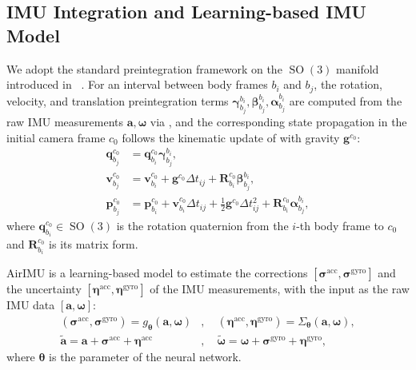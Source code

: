\subsection{IMU Integration and Learning-based IMU Model}
We adopt the standard preintegration framework on the $\operatorname{SO}(3)$ manifold introduced in ~\cite{forster2015imu}.
For an interval between body frames $b_i$ and $b_j$, the rotation, velocity, and translation preintegration terms $\bm{\gamma}_{b_j}^{b_i}, \bm{\beta}_{b_j}^{b_i}, \bm{\alpha}_{b_j}^{b_i}$ are computed from the raw IMU measurements $\mathbf{a},\bm{\omega}$ via , and the corresponding state propagation in the initial camera frame $c_0$ follows the kinematic update of  with gravity $\mathbf{g}^{c_0}$:
\begin{equation}
\label{eq:maci2:imu_integration}
\begin{aligned}
\mathbf{q}^{c_0}_{b_j} &= \mathbf{q}^{c_0}_{b_i} \bm{\gamma}_{b_j}^{b_i}, \\
\mathbf{v}_{b_j}^{c_0} &= \mathbf{v}_{b_i}^{c_0} + \mathbf{g}^{c_0} \Delta t_{ij} + \mathbf{R}^{c_0}_{b_i} \bm{\beta}_{b_j}^{b_i}, \\
\mathbf{p}^{c_0}_{b_{j}} &= \mathbf{p}^{c_0}_{b_i} + \mathbf{v}^{c_0}_{b_i} \Delta t_{ij} + \frac{1}{2} \mathbf{g}^{c_0} \Delta t_{ij}^2 + \mathbf{R}^{c_0}_{b_i} \bm{\alpha}_{b_j}^{b_i},
\end{aligned}
\end{equation}
where $\mathbf{q}^{c_0}_{b_i}\in\operatorname{SO}(3)$ is the rotation quaternion from the $i$-th body frame to $c_0$ and $\mathbf{R}^{c_0}_{b_i}$ is its matrix form.

AirIMU \cite{qiu2023airimu} is a learning-based model to estimate the corrections $[\bm{\sigma}^{\text{acc}},\bm{\sigma}^{\text{gyro}}]$ and the uncertainty $[\bm{\eta}^{\text{acc}}, \bm{\eta}^{\text{gyro}}]$ of the IMU measurements, with the input as the raw IMU data $[\mathbf{a}, \bm{\omega}]$:
\begin{equation}
\label{eq:maci2:correction_uncertainty}
\begin{aligned}
(\bm{\sigma}^{\text{acc}},\bm{\sigma}^{\text{gyro}}) = g_{\bm{\theta}} (\mathbf{a},\bm{\omega})&, \quad (\bm{\eta}^{\text{acc}}, \bm{\eta}^{\text{gyro}}) = \Sigma_{\bm{\theta}} (\mathbf{a},\bm{\omega}), \\
\tilde{\mathbf{a}} = \mathbf{a} + \bm{\sigma}^{\text{acc}} + \bm{\eta}^{\text{acc}}&, \quad \tilde{\bm{\omega}} = \bm{\omega} + \bm{\sigma}^{\text{gyro}} + \bm{\eta}^{\text{gyro}},
\end{aligned}
\end{equation}
where $\bm{\theta}$ is the parameter of the neural network.

